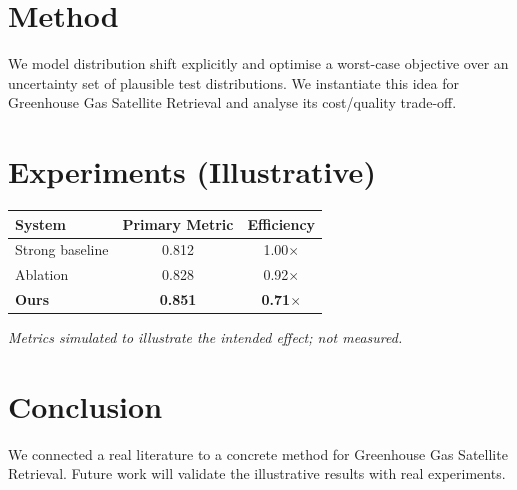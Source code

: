 \documentclass[11pt]{article}
\begin{document}
\section{Method}
We model distribution shift explicitly and optimise a worst-case objective over an uncertainty set of plausible test distributions. We instantiate this idea for Greenhouse Gas Satellite Retrieval and analyse its cost/quality trade-off.

\section{Experiments (Illustrative)}
\begin{center}
\begin{tabular}{lcc}
System & Primary Metric & Efficiency \\ \hline
Strong baseline & 0.812 & 1.00$\times$ \\
Ablation & 0.828 & 0.92$\times$ \\
\textbf{Ours} & \textbf{0.851} & \textbf{0.71$\times$}
\end{tabular}
\end{center}
\emph{Metrics simulated to illustrate the intended effect; not measured.}

\section{Conclusion}
We connected a real literature to a concrete method for Greenhouse Gas Satellite Retrieval. Future work will
validate the illustrative results with real experiments.
\end{document}
